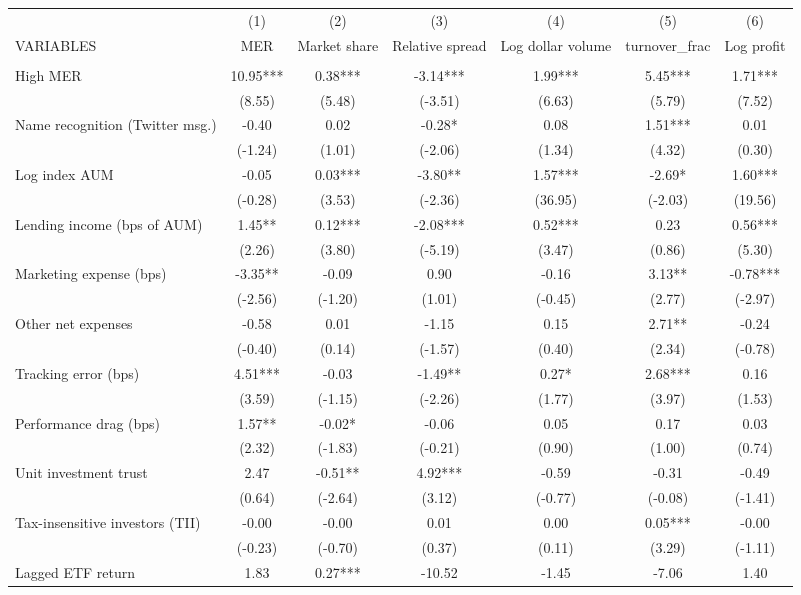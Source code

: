 \documentclass[]{article}
\begin{document}
\begin{tabular}{lcccccc} \hline
 & (1) & (2) & (3) & (4) & (5) & (6) \\
VARIABLES & MER & Market share & Relative spread & Log dollar volume & turnover\_frac & Log profit \\ \hline
 &  &  &  &  &  &  \\
High MER & 10.95*** & 0.38*** & -3.14*** & 1.99*** & 5.45*** & 1.71*** \\
 & (8.55) & (5.48) & (-3.51) & (6.63) & (5.79) & (7.52) \\
Name recognition (Twitter msg.) & -0.40 & 0.02 & -0.28* & 0.08 & 1.51*** & 0.01 \\
 & (-1.24) & (1.01) & (-2.06) & (1.34) & (4.32) & (0.30) \\
Log index AUM & -0.05 & 0.03*** & -3.80** & 1.57*** & -2.69* & 1.60*** \\
 & (-0.28) & (3.53) & (-2.36) & (36.95) & (-2.03) & (19.56) \\
Lending income (bps of AUM) & 1.45** & 0.12*** & -2.08*** & 0.52*** & 0.23 & 0.56*** \\
 & (2.26) & (3.80) & (-5.19) & (3.47) & (0.86) & (5.30) \\
Marketing expense (bps) & -3.35** & -0.09 & 0.90 & -0.16 & 3.13** & -0.78*** \\
 & (-2.56) & (-1.20) & (1.01) & (-0.45) & (2.77) & (-2.97) \\
Other net expenses & -0.58 & 0.01 & -1.15 & 0.15 & 2.71** & -0.24 \\
 & (-0.40) & (0.14) & (-1.57) & (0.40) & (2.34) & (-0.78) \\
Tracking error (bps) & 4.51*** & -0.03 & -1.49** & 0.27* & 2.68*** & 0.16 \\
 & (3.59) & (-1.15) & (-2.26) & (1.77) & (3.97) & (1.53) \\
Performance drag (bps) & 1.57** & -0.02* & -0.06 & 0.05 & 0.17 & 0.03 \\
 & (2.32) & (-1.83) & (-0.21) & (0.90) & (1.00) & (0.74) \\
Unit investment trust & 2.47 & -0.51** & 4.92*** & -0.59 & -0.31 & -0.49 \\
 & (0.64) & (-2.64) & (3.12) & (-0.77) & (-0.08) & (-1.41) \\
Tax-insensitive investors (TII) & -0.00 & -0.00 & 0.01 & 0.00 & 0.05*** & -0.00 \\
 & (-0.23) & (-0.70) & (0.37) & (0.11) & (3.29) & (-1.11) \\
Lagged ETF return & 1.83 & 0.27*** & -10.52 & -1.45 & -7.06 & 1.40 \\

\end{tabular}
\end{document}
